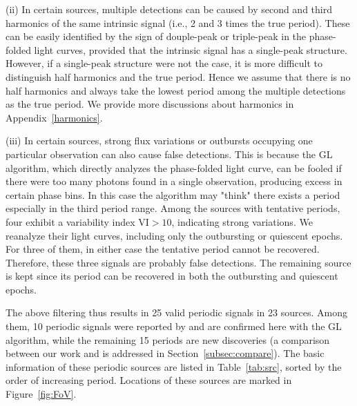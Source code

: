 \documentclass[twoside,twocolumn]{aastex63}
\begin{document}
(ii) In certain sources, multiple detections can be caused by second and third harmonics of the same intrinsic signal (i.e., 2 and 3 times the true period). These can be easily identified by the sign of douple-peak or triple-peak in the phase-folded light curves, provided that the intrinsic signal has a single-peak structure. However, if a single-peak structure were not the case, it is more difficult to distinguish half harmonics and the true period. Hence we assume that there is no half harmonics and always take the lowest period among the multiple detections as the true period. We provide more discussions about harmonics in Appendix~\ref{harmonics}. 

(iii) In certain sources, strong flux variations or outbursts occupying one particular observation can also cause false detections. This is because the GL algorithm, which directly analyzes the phase-folded light curve, can be fooled if there were too many photons found in a single observation, producing excess in certain phase bins. In this case the algorithm may "think" there exists a period especially in the third period range. Among the sources with tentative periods, four exhibit a variability index VI$>10$, indicating strong variations. We reanalyze their light curves, including only the outbursting or quiescent epochs. For three of them, in either case the tentative period cannot be recovered. Therefore, these three signals are probably false detections. The remaining source is kept since its period can be recovered in both the outbursting and quiescent epochs. 

The above filtering thus results in 25 valid periodic signals in 23 sources.
Among them, 10 periodic signals were reported by \citet{2012ApJ...746..165H} and are confirmed here with the GL algorithm, while the remaining 15 periods are new discoveries (a comparison between our work and \citealp{2012ApJ...746..165H} is addressed in Section~\ref{subsec:compare}). 
The basic information of these periodic sources are listed in Table~\ref{tab:src}, sorted by the order of increasing period. 
Locations of these sources are marked in Figure~\ref{fig:FoV}.
\end{document}
